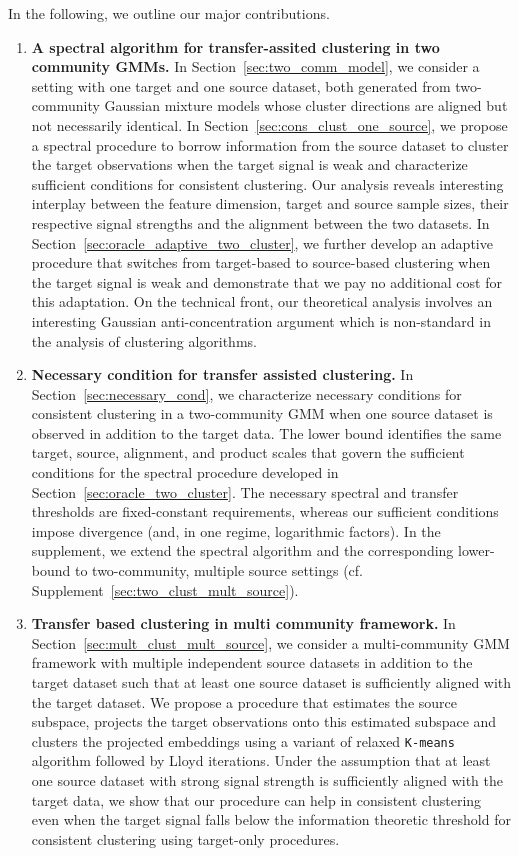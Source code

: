 \documentclass[10pt]{article}
\begin{document}
In the following, we outline our major contributions.

\begin{enumerate}
\item {\bf A spectral algorithm for transfer-assited clustering in two community GMMs.} In Section~\ref{sec:two_comm_model}, we consider a setting with one target and one source dataset, both generated from two-community Gaussian mixture models whose cluster directions are aligned but not necessarily identical. In Section~\ref{sec:cons_clust_one_source}, we propose a spectral procedure to borrow information from the source dataset to cluster the target observations when the target signal is weak and characterize sufficient conditions for consistent clustering. Our analysis reveals interesting interplay between the feature dimension, target and source sample sizes, their respective signal strengths and the alignment between the two datasets. In Section~\ref{sec:oracle_adaptive_two_cluster}, we further develop an adaptive procedure that switches from target-based to source-based clustering when the target signal is weak and demonstrate that we pay no additional cost for this adaptation. On the technical front, our theoretical analysis involves an interesting Gaussian anti-concentration argument which is non-standard in the analysis of clustering algorithms.

\item {\bf Necessary condition for transfer assisted clustering.} In Section~\ref{sec:necessary_cond}, we characterize necessary conditions for consistent clustering in a two-community GMM when one source dataset is observed in addition to the target data. The lower bound identifies the same target, source, alignment, and product scales that govern the sufficient conditions for the spectral procedure developed in Section~\ref{sec:oracle_two_cluster}. The necessary spectral and transfer thresholds are fixed-constant requirements, whereas our sufficient conditions impose divergence (and, in one regime, logarithmic factors). In the supplement, we extend the spectral algorithm and the corresponding lower-bound to two-community, multiple source settings (cf. Supplement~\ref{sec:two_clust_mult_source}).

\item {\bf Transfer based clustering in multi community framework.} In Section~\ref{sec:mult_clust_mult_source}, we consider a multi-community GMM framework with multiple independent source datasets in addition to the target dataset such that at least one source dataset is sufficiently aligned with the target dataset. We propose a procedure that estimates the source subspace, projects the target observations onto this estimated subspace and clusters the projected embeddings using a variant of relaxed \texttt{K-means} algorithm followed by Lloyd iterations. Under the assumption that at least one source dataset with strong signal strength is sufficiently aligned with the target data, we show that our procedure can help in consistent clustering even when the target signal falls below the information theoretic threshold for consistent clustering using target-only procedures.


\end{enumerate}
\end{document}
